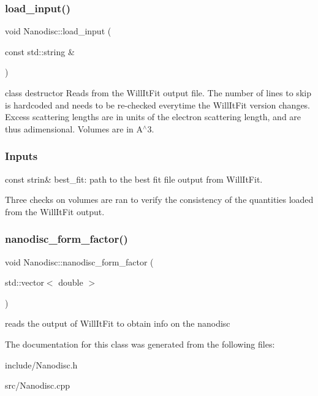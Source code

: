 \subsubsection{\texorpdfstring{load\_input()}{load\_input()}}
{\footnotesize\ttfamily void Nanodisc\+::load\+\_\+input (\begin{DoxyParamCaption}\item[{const std\+::string \&}]{ }\end{DoxyParamCaption})}

class destructor Reads from the Will\+It\+Fit output file. The number of lines to skip is hardcoded and needs to be re-\/checked everytime the Will\+It\+Fit version changes. Excess scattering lengths are in units of the electron scattering length, and are thus adimensional. Volumes are in A$^\wedge$3.

\subsubsection*{Inputs }

const strin\& best\+\_\+fit\+: path to the best fit file output from Will\+It\+Fit.

Three checks on volumes are ran to verify the consistency of the quantities loaded from the Will\+It\+Fit output. \mbox{\label{class_nanodisc_ab768b3dc4974ac2c6fc820d848f1698f}} 
\subsubsection{\texorpdfstring{nanodisc\_form\_factor()}{nanodisc\_form\_factor()}}
{\footnotesize\ttfamily void Nanodisc\+::nanodisc\+\_\+form\+\_\+factor (\begin{DoxyParamCaption}\item[{std\+::vector$<$ double $>$}]{ }\end{DoxyParamCaption})}

reads the output of Will\+It\+Fit to obtain info on the nanodisc 

The documentation for this class was generated from the following files\+:\begin{DoxyCompactItemize}
\item 
include/Nanodisc.\+h\item 
src/Nanodisc.\+cpp\end{DoxyCompactItemize}
